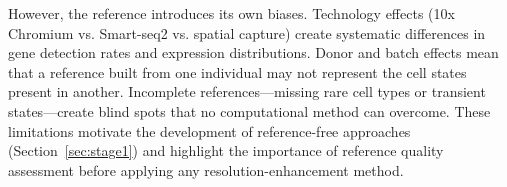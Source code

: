 However, the reference introduces its own biases. Technology effects (10x Chromium vs. Smart-seq2 vs. spatial capture) create systematic differences in gene detection rates and expression distributions. Donor and batch effects mean that a reference built from one individual may not represent the cell states present in another. Incomplete references---missing rare cell types or transient states---create blind spots that no computational method can overcome. These limitations motivate the development of reference-free approaches (Section~\ref{sec:stage1}) and highlight the importance of reference quality assessment before applying any resolution-enhancement method.


